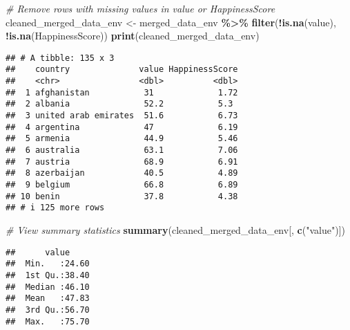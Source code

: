 \documentclass[
]{article}
\newenvironment{Shaded}{\begin{snugshade}}{\end{snugshade}}
\newcommand{\CommentTok}[1]{\textcolor[rgb]{0.56,0.35,0.01}{\textit{#1}}}
\newcommand{\FunctionTok}[1]{\textcolor[rgb]{0.13,0.29,0.53}{\textbf{#1}}}
\newcommand{\NormalTok}[1]{#1}
\newcommand{\OtherTok}[1]{\textcolor[rgb]{0.56,0.35,0.01}{#1}}
\newcommand{\SpecialCharTok}[1]{\textcolor[rgb]{0.81,0.36,0.00}{\textbf{#1}}}
\newcommand{\StringTok}[1]{\textcolor[rgb]{0.31,0.60,0.02}{#1}}
\begin{document}
\begin{Shaded}
\begin{Highlighting}[]
\CommentTok{\# Remove rows with missing values in value or HappinessScore}
\NormalTok{cleaned\_merged\_data\_env }\OtherTok{\textless{}{-}}\NormalTok{ merged\_data\_env }\SpecialCharTok{\%\textgreater{}\%}
  \FunctionTok{filter}\NormalTok{(}\SpecialCharTok{!}\FunctionTok{is.na}\NormalTok{(value), }\SpecialCharTok{!}\FunctionTok{is.na}\NormalTok{(HappinessScore))}
\FunctionTok{print}\NormalTok{(cleaned\_merged\_data\_env)}
\end{Highlighting}
\end{Shaded}

\begin{verbatim}
## # A tibble: 135 x 3
##    country              value HappinessScore
##    <chr>                <dbl>          <dbl>
##  1 afghanistan           31             1.72
##  2 albania               52.2           5.3 
##  3 united arab emirates  51.6           6.73
##  4 argentina             47             6.19
##  5 armenia               44.9           5.46
##  6 australia             63.1           7.06
##  7 austria               68.9           6.91
##  8 azerbaijan            40.5           4.89
##  9 belgium               66.8           6.89
## 10 benin                 37.8           4.38
## # i 125 more rows
\end{verbatim}

\begin{Shaded}
\begin{Highlighting}[]
\CommentTok{\# View summary statistics }
\FunctionTok{summary}\NormalTok{(cleaned\_merged\_data\_env[, }\FunctionTok{c}\NormalTok{(}\StringTok{"value"}\NormalTok{)])}
\end{Highlighting}
\end{Shaded}

\begin{verbatim}
##      value      
##  Min.   :24.60  
##  1st Qu.:38.40  
##  Median :46.10  
##  Mean   :47.83  
##  3rd Qu.:56.70  
##  Max.   :75.70
\end{verbatim}
\end{document}
